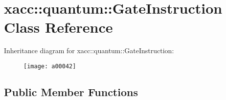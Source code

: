 \hypertarget{a00042}{}\section{xacc\+:\+:quantum\+:\+:Gate\+Instruction Class Reference}
\label{a00042}
Inheritance diagram for xacc\+:\+:quantum\+:\+:Gate\+Instruction\+:\begin{figure}[H]
\begin{center}
\leavevmode
\texttt{[image: a00042]}
\end{center}
\end{figure}
\subsection*{Public Member Functions}
